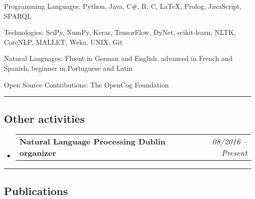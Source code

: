 \documentclass[10pt,letterpaper]{article}
\makeatletter
\newenvironment{indentsection}[1]%
{\begin{list}{}%
	{\setlength{\leftmargin}{#1}}%
	\item[]%
}
{\end{list}}
\newcommand{\headerrow}[2]
{\begin{tabular*}{\linewidth}{l@{\extracolsep{\fill}}r}
	#1 &
	#2 \\
\end{tabular*}}
\makeatother
\begin{document}
\begin{indentsection}{\parindent}
\begin{description*}
	\item[Programming Languages:]
	Python, Java, C\#, R, C, \LaTeX, Prolog, JavaScript, SPARQL
	\item[Technologies:]
	SciPy, NumPy, Keras, TensorFlow, DyNet, scikit-learn, NLTK, CoreNLP, MALLET, Weka, UNIX, Git
	\item[Natural Languages:]
	Fluent in German and English, advanced in French and Spanish, beginner in Portuguese and Latin	
	\item[Open Source Contributions:]
	The OpenCog Foundation
\end{description*}
\end{indentsection}

\hrule
\vspace{-0.4em}
\subsection*{Other activities}

\begin{itemize}
	\parskip=0.1em
		\item 
	\headerrow
		{\textbf{Natural Language Processing Dublin organizer}}
		{\emph{08/2016 -- Present}}

\end{itemize}

\hrule
\vspace{-0.4em}
\subsection*{Publications}
\end{document}
